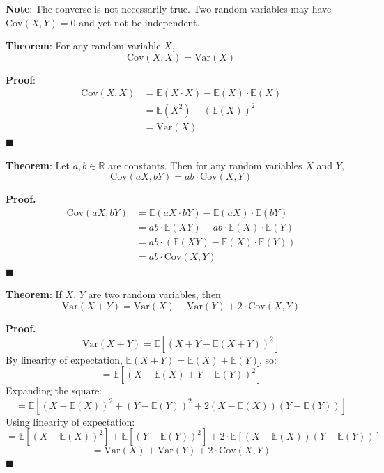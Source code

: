 \documentclass[twoside]{book}
\begin{document}
\textbf{Note}: The converse is not necessarily true. Two random variables may have \( \mathrm{Cov}(X, Y) = 0 \) and yet not be independent.

\begin{textbox}
\textbf{Theorem}: For any random variable \( X \),
\[
\mathrm{Cov}(X, X) = \mathrm{Var}(X)
\]
\end{textbox}

\textbf{Proof}: 
\begin{align*}
\mathrm{Cov}(X, X) &= \mathbb{E}(X \cdot X) - \mathbb{E}(X)\cdot \mathbb{E}(X) \\
&= \mathbb{E}(X^2) - (\mathbb{E}(X))^2 \\
&= \mathrm{Var}(X)
\end{align*}
\hfill\(\blacksquare\)

\begin{textbox}
\textbf{Theorem}: Let \( a, b \in \mathbb{R} \) are constants. Then for any random variables \( X \) and \( Y \),
\[
\mathrm{Cov}(aX, bY) = ab \cdot \mathrm{Cov}(X, Y)
\]
\end{textbox}

\textbf{Proof.}  
\begin{align*}
\mathrm{Cov}(aX, bY) &= \mathbb{E}(aX \cdot bY) - \mathbb{E}(aX)\cdot \mathbb{E}(bY) \\
&= ab \cdot \mathbb{E}(XY) - ab \cdot \mathbb{E}(X)\cdot \mathbb{E}(Y) \\
&= ab \cdot \left( \mathbb{E}(XY) - \mathbb{E}(X)\cdot \mathbb{E}(Y) \right) \\
&= ab \cdot \mathrm{Cov}(X, Y)
\end{align*}
\hfill\(\blacksquare\)

\begin{textbox}
\textbf{Theorem}: If $X$, $Y$ are two random variables, then  
\[
\mathrm{Var}(X+Y) = \mathrm{Var}(X) + \mathrm{Var}(Y) + 2 \cdot \mathrm{Cov}(X, Y)
\]
\end{textbox}

\textbf{Proof.}  
\[
\mathrm{Var}(X + Y) = \mathbb{E}[(X + Y - \mathbb{E}(X + Y))^2]
\]
By linearity of expectation, \( \mathbb{E}(X + Y) = \mathbb{E}(X) + \mathbb{E}(Y) \), so:
\[
= \mathbb{E}[(X - \mathbb{E}(X) + Y - \mathbb{E}(Y))^2]
\]
Expanding the square:
\[
= \mathbb{E}[(X - \mathbb{E}(X))^2 + (Y - \mathbb{E}(Y))^2 + 2(X - \mathbb{E}(X))(Y - \mathbb{E}(Y))]
\]
Using linearity of expectation:
\[
= \mathbb{E}[(X - \mathbb{E}(X))^2] + \mathbb{E}[(Y - \mathbb{E}(Y))^2] + 2 \cdot \mathbb{E}[(X - \mathbb{E}(X))(Y - \mathbb{E}(Y))]
\]
\[
= \mathrm{Var}(X) + \mathrm{Var}(Y) + 2 \cdot \mathrm{Cov}(X, Y)
\]
\hfill\(\blacksquare\)
\end{document}

